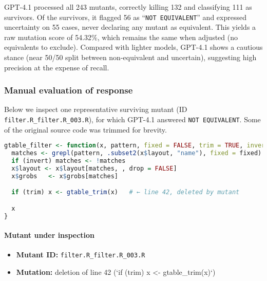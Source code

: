 GPT-4.1 processed all 243 mutants, correctly killing 132 and classifying 111 as survivors.  Of the survivors, it flagged 56 as “\texttt{NOT EQUIVALENT}” and expressed uncertainty on 55 cases, never declaring any mutant as equivalent.  This yields a raw mutation score of 54.32\%, which remains the same when adjusted (no equivalents to exclude).  Compared with lighter models, GPT-4.1 shows a cautious stance (near 50/50 split between non-equivalent and uncertain), suggesting high precision at the expense of recall.

\subsubsection{Manual evaluation of response}

Below we inspect one representative surviving mutant (ID \texttt{filter.R\_filter.R\_003.R}), for which GPT-4.1 answered \texttt{NOT EQUIVALENT}.  Some of the original source code was trimmed for brevity.

\begin{lstlisting}[language=R, caption={Original \texttt{gtable\_filter} (trimmed)}]
gtable_filter <- function(x, pattern, fixed = FALSE, trim = TRUE, invert = FALSE) {
  matches <- grepl(pattern, .subset2(x$layout, "name"), fixed = fixed)
  if (invert) matches <- !matches
  x$layout <- x$layout[matches, , drop = FALSE]
  x$grobs   <- x$grobs[matches]

  if (trim) x <- gtable_trim(x)   # ← line 42, deleted by mutant

  x
}
\end{lstlisting}

\paragraph{Mutant under inspection}
\begin{itemize}
  \item \textbf{Mutant ID:} \texttt{filter.R\_filter.R\_003.R}
  \item \textbf{Mutation:} deletion of line 42 (`if (trim) x <- gtable_trim(x)`)
\end{itemize}

